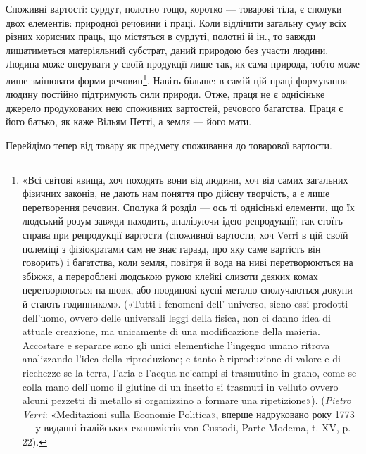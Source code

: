 Споживні вартості: сурдут, полотно тощо, коротко — товарові
тіла, є сполуки двох елементів: природної речовини і праці. Коли
відлічити загальну суму всіх різних корисних праць, що містяться
в сурдуті, полотні й ін., то завжди лишатиметься матеріяльний
субстрат, даний природою без участи людини. Людина може оперувати
у своїй продукції лише так, як сама природа, тобто може
лише змінювати форми речовин\footnote{
«Всі світові явища, хоч походять вони від людини, хоч від самих
загальних фізичних законів, не дають нам поняття про дійсну творчість,
а є лише перетворення речовин. Сполука й розділ — ось ті однісінькі
елементи, що їх людський розум завжди находить, аналізуючи ідею репродукції;
так стоїть справа при репродукції вартости (споживної вартости,
хоч Verri в цій своїй полеміці з фізіократами сам не знає гаразд, про яку
саме вартість він говорить) і багатства, коли земля, повітря й вода на
ниві перетворюються на збіжжя, а перероблені людською рукою клейкі
слизоти деяких комах перетворюються на шовк, або поодинокі кусні
металю сполучаються докупи й стають годинником». («Tutti і fenomeni
dell' universo, sieno essi prodotti dell’uomo, ovvero delle universali leggi
della fisica, non ci danno idea di attuale creazione, ma unicamente di una
modificazione della maieria. Accostare e separare sono gli unici elementiche
l’ingegno umano ritrova analizzando l’idea della riproduzione; e tanto
è riproduzione di valore e di ricchezze se la terra, l’aria e l’acqua ne’campi
si trasmutino in grano, come se colla mano dell'uomo il glutine di un insetto
si trasmuti in velluto ovvero alcuni pezzetti di metallo si organizzino a formare
una ripetizione»). (\emph{Pietro Verri}: «Meditazioni sulla Economie Politica»,
вперше надруковано року 1773 — y виданні італійських економістів
von Custodi, Parte Modema, t. XV, p. 22).
}. Навіть більше: в самій цій праці
формування людину постійно підтримують сили природи. Отже,
праця не є однісіньке джерело продукованих нею споживних вартостей,
речового багатства. Праця є його батько, як каже Вільям
Петті, а земля — його мати.

Перейдімо тепер від товару як предмету споживання до товарової
вартости.

